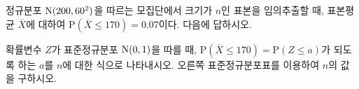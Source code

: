 \noindent\begin{minipage}[t]{0.58\linewidth}\vspace{0pt}\raggedright 정규분포 $\mathrm{N}(200{,}\mkern3mu\mathopen{}60^2)$을 따르는 모집단에서 크기가 $n$인 표본을 임의추출할 때, 표본평균 $\overline{X}$에 대하여 $\mathrm{P}(\overline{X}\le 170)=0.07$이다. 다음에 답하시오.\end{minipage}\hfill\begin{minipage}[t]{0.4\linewidth}\vspace{0pt}\centering \resizebox{\ifdim\width>\linewidth\linewidth\else\width\fi}{!}{}\end{minipage}\par
{} 확률변수 $Z$가 표준정규분포 $\mathrm{N}(0{,}\mkern3mu\mathopen{}1)$을 따를 때, $\mathrm{P}(\overline{X}\le 170)=\mathrm{P}(Z\le a)$가 되도록 하는 $a$를 $n$에 대한 식으로 나타내시오.
 오른쪽 표준정규분포표를 이용하여 $n$의 값을 구하시오.
